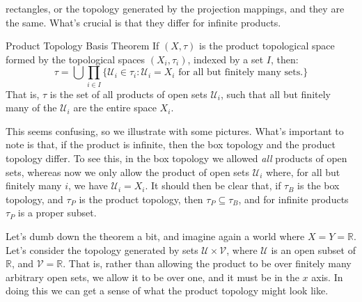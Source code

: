     rectangles, or the topology generated by the projection mappings,
    and they are the same. What's crucial is that they differ for
    infinite products.
    \begin{ltheorem}{Product Topology Basis Theorem}
        If $(X,\tau)$ is the product topological space formed by
        the topological spaces $(X_{i},\tau_{i})$, indexed by
        a set $I$, then:
        \begin{equation}
            \tau=\bigcup\prod_{i\in{I}}
                \big\{\mathcal{U}_{i}\in\tau_{i}:
                    \mathcal{U}_{i}=X_{i}
                    \textrm{ for all but finitely many sets.}
                \big\}
        \end{equation}
        That is, $\tau$ is the set of all products of open sets
        $\mathcal{U}_{i}$, such that all but finitely many of
        the $\mathcal{U}_{i}$ are the entire space $X_{i}$.
    \end{ltheorem}
    \par\hfill\par
    This seems confusing, so we illustrate with some pictures. What's
    important to note is that, if the product is infinite, then
    the box topology and the product topology differ. To see this,
    in the box topology we allowed \textit{all} products of open
    sets, whereas now we only allow the product of open sets
    $\mathcal{U}_{i}$ where, for all but finitely many $i$, we
    have $\mathcal{U}_{i}=X_{i}$. It should then be clear that,
    if $\tau_{B}$ is the box topology, and $\tau_{P}$ is the
    product topology, then $\tau_{P}\subseteq\tau_{B}$, and for
    infinite products $\tau_{P}$ is a proper subset.
    \par\hfill\par
    Let's dumb down the theorem a bit, and imagine again a world
    where $X=Y=\mathbb{R}$. Let's consider the topology generated
    by sets $\mathcal{U}\times\mathcal{V}$, where $\mathcal{U}$
    is an open subset of $\mathbb{R}$, and
    $\mathcal{V}=\mathbb{R}$. That is, rather than allowing
    the product to be over finitely many arbitrary open sets,
    we allow it to be over one, and it must be in the $x$ axis.
    In doing this we can get a sense of what the product topology
    might look like.
